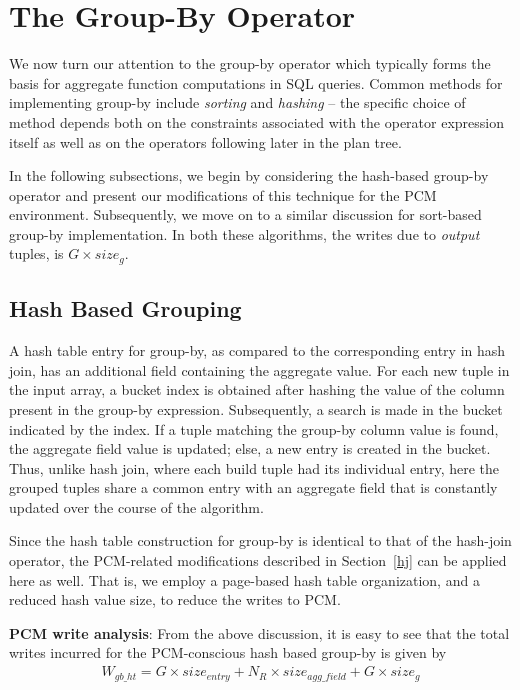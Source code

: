 \section{The Group-By Operator}%
\label{gby}
We now turn our attention to the group-by operator which typically
forms the basis for aggregate function computations in SQL queries.
Common methods for implementing group-by include \textit{sorting} and
\textit{hashing} -- the specific choice of method depends both on the
constraints associated with the operator expression itself as well as
on the operators following later in the plan tree.

In the following subsections, we begin by considering the hash-based
group-by operator and present our modifications of this technique for
the PCM environment. Subsequently, we move on to a similar discussion
for sort-based group-by implementation. In both these algorithms, the writes due to \emph{output} tuples, is $G \times size_g$.

\subsection{Hash Based Grouping}

A hash table entry for group-by, as compared to the corresponding
entry in hash join, has an additional field containing the aggregate
value. For each new tuple in the input array, a bucket index is
obtained after hashing the value of the column present in the group-by
expression. Subsequently, a search is made in the bucket indicated by
the index. If a tuple matching the group-by column value is found, the
aggregate field value is updated; else, a new entry is created in the
bucket. Thus, unlike hash join, where each build tuple had its individual
entry, here the grouped tuples share a common entry with an aggregate
field that is constantly updated over the course of the algorithm.

Since the hash table construction for group-by is identical to that
of the hash-join operator, the PCM-related modifications described
in Section~\ref{hj} can be applied here as well. That is, we employ
a page-based hash table organization, and a reduced hash value size,
to reduce the writes to PCM.

\textbf{PCM write analysis}: From the above discussion, it is easy to see
that the total writes incurred for the PCM-conscious hash based group-by is given by
\begin{equation}
\label{eq:gb_ht}
\begin{split}
W_{gb\_ht} = G \times size_{entry} + 
N_R \times size_{agg\_field} + G \times size_g
\end{split}
\end{equation}

